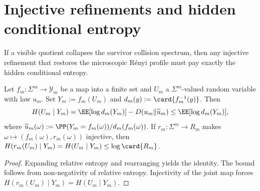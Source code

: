 \appendix
\section{Injective refinements and hidden conditional entropy}
\label{sec:injective-appendix}

If a visible quotient collapses the survivor collision spectrum, then any
injective refinement that restores the microscopic R\'enyi profile must
pay exactly the hidden conditional entropy.

\begin{theorem}
\label{thm:entropy-ledger}
Let \(f_m:\Sigma^m\to \mathcal{Y}_m\) be a map into a finite set and
\(U_m\) a \(\Sigma^m\)-valued random variable with law \(u_m\).  Set
\(Y_m:=f_m(U_m)\) and \(d_m(y):=\card{f_m^{-1}(y)}\).  Then
\[
  H(U_m\mid Y_m)
  = \EE[\log d_m(Y_m)]-D(u_m\Vert \widetilde u_m)
  \leq \EE[\log d_m(Y_m)],
\]
where \(\widetilde u_m(\omega):=\PP(Y_m=f_m(\omega))/d_m(f_m(\omega))\).
If \(r_m:\Sigma^m\to R_m\) makes \(\omega\mapsto (f_m(\omega),r_m(\omega))\)
injective, then \(H(r_m(U_m)\mid Y_m)=H(U_m\mid Y_m)\leq \log\card{R_m}\).
\end{theorem}

\begin{proof}
Expanding relative entropy and rearranging yields the identity.  The
bound follows from non-negativity of relative entropy.  Injectivity of
the joint map forces \(H(r_m(U_m)\mid Y_m)=H(U_m\mid Y_m)\).
\end{proof}
